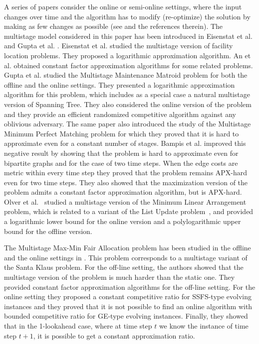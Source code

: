 \documentclass[a4paper]{book}
\begin{document}
A series of papers consider the  online or semi-online settings, where the input changes over
time and the algorithm has to modify (re-optimize) the solution by making as few changes
as possible (see \cite{Anthony,Blanchard,Cohen,Gu,Megow,Nagarajan}%
and the references therein). 
The multistage model considered in this paper has been introduced in Eisenstat
et al. \cite{Eisenstat} and Gupta et al. \cite{Gupta}. Eisenstat
et al. \cite{Eisenstat} studied the multistage version of facility location problems. They proposed a logarithmic approximation algorithm. An et al. \cite{An} obtained constant factor approximation algorithms for some related problems.
 Gupta et al. \cite{Gupta} studied the {\sc Multistage  Maintenance Matroid} problem for
both the offline and the online settings. They presented a logarithmic approximation
algorithm for this problem, which includes as a special case a natural multistage version of
{\sc Spanning Tree}. They also considered the online version of the problem and they provide an efficient randomized competitive algorithm against any oblivious adversary. The same paper also introduced the study of the {\sc Multistage  Minimum Perfect Matching} problem for which they proved that it is hard to approximate 
 even for a constant number of stages.  Bampis et al. \cite{Bampis} improved this negative result by showing that the problem is
hard to approximate even for bipartite graphs and for the case of two time steps. When the edge costs are metric within every time step they  proved that the problem remains APX-hard even for two time steps. They also showed that the maximization version of the problem admits a constant factor approximation algorithm, but is APX-hard. Olver et al.~\cite{Olver} studied a multistage version of the {\sc Minimum Linear Arrangement} problem, which is related to a variant of the {\sc List Update} problem~\cite{Sleator}, and provided a logarithmic lower bound for the online version and a polylogarithmic upper bound for the offline version.

 The {\sc Multistage Max-Min Fair Allocation}
problem has been studied in the offline and  the online settings in \cite{Bampis+}. This problem corresponds to a multistage variant of the {\sc Santa Klaus} problem. For the off-line setting, the authors
showed that the multistage version of the problem is much harder
than the static one. They provided
constant factor approximation algorithms for the off-line setting. For the online setting they proposed a constant competitive ratio for SSFS-type evolving instances and they proved that it is not possible to find an online algorithm with bounded competitive ratio for GE-type evolving instances. Finally, they showed that in the 1-lookahead case, where at time step $t$ we know the instance of time step $t+1$, it is possible to get a constant approximation ratio.  
\end{document}
